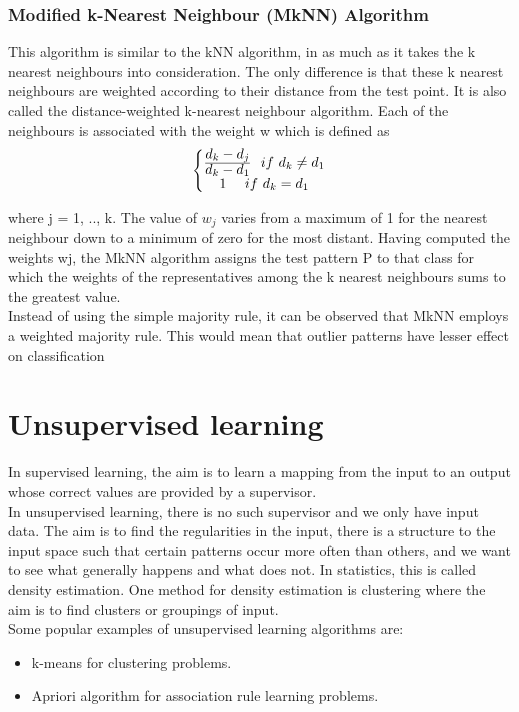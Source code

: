 \subsubsection{Modified k-Nearest Neighbour (MkNN) Algorithm}
This algorithm is similar to the kNN algorithm, in as much as it takes the k nearest
neighbours into consideration. The only difference is that these k nearest neighbours
are weighted according to their distance from the test point. It is also called
the distance-weighted k-nearest neighbour algorithm. Each of the neighbours is
associated with the weight w which is defined as
$$ \left\{\begin{matrix}
\frac{ \mathlarger{d_{k} - d_{j}}} { \mathlarger{{d_{k} - d_{1}} }} \   \ if \ d_{k} \neq d_{1} \\ 
\mathlarger{1} \  \   \     \ if \ d_{k}  =  d_{1}
\end{matrix}\right.   $$

where j = 1, .., k. The value of $w_{j}$ varies from a maximum of 1 for the nearest
neighbour down to a minimum of zero for the most distant. Having computed the
weights wj, the MkNN algorithm assigns the test pattern P to that class for which the
weights of the representatives among the k nearest neighbours sums to the greatest
value.\\
Instead of using the simple majority rule, it can be observed that MkNN employs
a weighted majority rule. This would mean that outlier patterns have lesser effect on
classification

\section{Unsupervised learning}

In supervised learning, the aim is to learn a mapping from the input to
an output whose correct values are provided by a supervisor.\\
In unsupervised
learning, there is no such supervisor and we only have input data.
The aim is to find the regularities in the input, there is a structure to the
input space such that certain patterns occur more often than others, and we want to see what generally happens and what does not. In statistics, this is called density estimation.
One method for density estimation is clustering where the aim is to
find clusters or groupings of input.\\ 
Some popular examples of unsupervised learning algorithms are:


\begin{itemize}
  \item k-means for clustering problems.
  \item Apriori algorithm for association rule learning problems.
\end{itemize}


